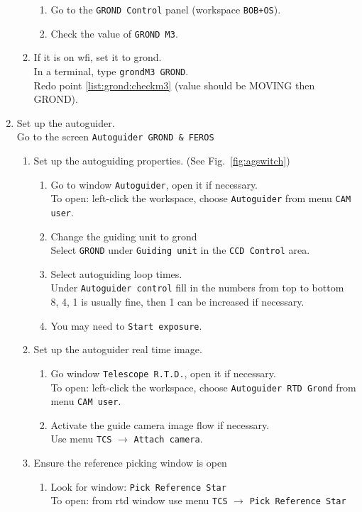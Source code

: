 \documentclass[11pt,fleqn]{book} %
\begin{document}
\begin{enumerate}
\begin{enumerate}
\begin{enumerate}
         \item Go to the \texttt{GROND Control} panel (workspace \texttt{BOB+OS}).
         \item Check the value of \texttt{GROND M3}.
      \end{enumerate}
      \item If it is on \gls{wfi}, set it to \gls{grond}.\\
            In a terminal, type \texttt{grondM3 GROND}.\\
            Redo point \ref{list:grond:checkm3} (value should be MOVING then GROND).
  \end{enumerate}
  \item Set up the autoguider.\\
        Go to the screen \texttt{Autoguider GROND \& FEROS}
  \begin{enumerate}
    \item Set up the autoguiding properties. (See Fig.~\ref{fig:agswitch})
    \begin{enumerate}
      \item Go to window \texttt{Autoguider}, open it if necessary.\\
            To open: left-click the workspace, choose \texttt{Autoguider} from menu \texttt{CAM user}.
      \item Change the guiding unit to \gls{grond}\\
            Select \texttt{GROND} under \texttt{Guiding unit} in the \texttt{CCD Control} area. 
      \item Select autoguiding loop times.\\
        Under \texttt{Autoguider control} fill in the numbers from top to bottom\\8, 4, 1 is usually fine, then 1 can be increased if necessary.
      \item You may need to \texttt{Start exposure}.
    \end{enumerate}
    \item Set up the autoguider real time image.
      \begin{enumerate}
      \item Go window \texttt{Telescope R.T.D.}, open it if necessary.\\
            To open: left-click the workspace, choose \texttt{Autoguider RTD Grond} from menu \texttt{CAM user}.
      \item Activate the guide camera image flow if necessary.\\
        Use menu \texttt{TCS} $\rightarrow$ \texttt{Attach camera}.
      \end{enumerate}
    \item Ensure the reference picking window is open
      \begin{enumerate}
        \item Look for window: \texttt{Pick Reference Star}\\
              To open: from \gls{rtd} window use menu \texttt{TCS} $\rightarrow$ \texttt{Pick Reference Star}
      \end{enumerate}
  \end{enumerate}
\end{enumerate}
\end{document}
